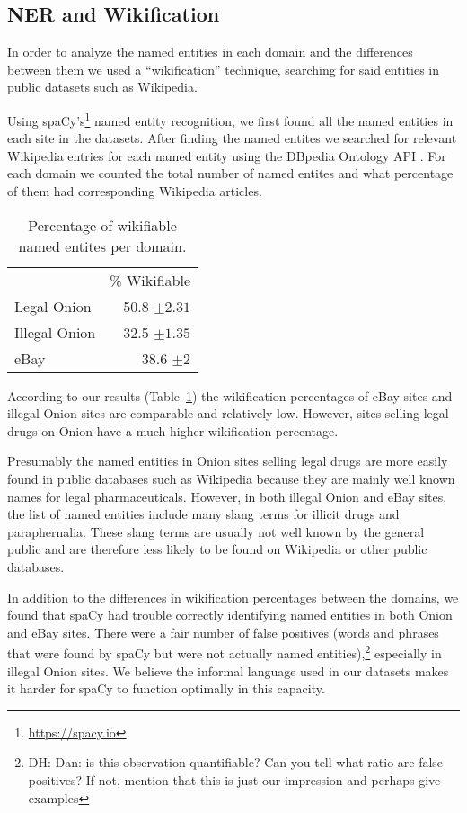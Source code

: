 \documentclass[11pt,a4paper]{article}
\newcommand{\daniel}[1]{\footnote{\color{brown}DH: #1}}
\begin{document}
\subsection{NER and Wikification}

In order to analyze the named entities in each domain and the differences
between them we used a ``wikification'' technique, searching for
said entities in public datasets such as Wikipedia. 

Using spaCy's\footnote{\url{https://spacy.io}}
named entity recognition, we first found all the named
entities in each site in the datasets. After finding the named entites
we searched for relevant Wikipedia entries for each named entity using
the DBpedia Ontology API \cite{auer2007dbpedia}.
For each domain we counted the total number
of named entites and what percentage of them had corresponding Wikipedia
articles.

\begin{table}
\begin{center}
\begin{tabular}{lr}
 & \% Wikifiable\\
Legal Onion & 50.8 $\pm2.31$\\
Illegal Onion & 32.5 $\pm1.35$\\
eBay & 38.6 $\pm2$\\
\end{tabular}
\end{center}
\caption{Percentage of wikifiable named entites per domain.\label{ta:wiki}}
\end{table}
According to our results (Table~\ref{ta:wiki}) the wikification percentages of
eBay sites and illegal Onion sites are comparable and relatively low.
However, sites selling legal drugs on Onion have a much higher wikification
percentage.

Presumably the named entities in Onion sites selling legal drugs are
more easily found in public databases such as Wikipedia because they
are mainly well known names for legal pharmaceuticals. However, in
both illegal Onion and eBay sites, the list of named entities include
many slang terms for illicit drugs and paraphernalia. These slang terms
are usually not well known by the general public and are therefore
less likely to be found on Wikipedia or other public databases.

In addition to the differences in wikification percentages between
the domains, we found that spaCy had trouble correctly identifying
named entities in both Onion and eBay sites. There were a fair number
of false positives (words and phrases that were found by spaCy but
were not actually named entities),\daniel{Dan: is this observation
quantifiable? Can you tell what ratio are false positives? If not,
mention that this is just our impression and perhaps give examples}
especially in illegal Onion sites.
We believe the informal language used in our datasets makes it harder
for spaCy to function optimally in this capacity.
\end{document}
